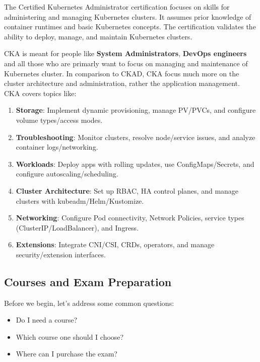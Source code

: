 \begin{definition}[CKA]
	The Certified Kubernetes Administrator certification focuses on skills for administering and managing Kubernetes clusters. It assumes prior knowledge of container runtimes and basic Kubernetes concepts. The certification validates the ability to deploy, manage, and maintain Kubernetes clusters\cite{linuxfoundation-cka}.
\end{definition}

CKA is meant for people like \textbf{System Administrators}, \textbf{DevOps engineers} and all those who are primarly want to focus on managing and maintenance of Kubernetes cluster. In comparison to CKAD, CKA focus much more on the cluster architecture and administration, rather the application management. CKA covers topics like\cite{linuxfoundation-cka}: 

\begin{enumerate}
	\item \textbf{Storage}: Implement dynamic provisioning, manage PV/PVCs, and configure volume types/access modes.  
	\item \textbf{Troubleshooting}: Monitor clusters, resolve node/service issues, and analyze container logs/networking.  
	\item \textbf{Workloads}: Deploy apps with rolling updates, use ConfigMaps/Secrets, and configure autoscaling/scheduling.  
	\item \textbf{Cluster Architecture}: Set up RBAC, HA control planes, and manage clusters with kubeadm/Helm/Kustomize.  
	\item \textbf{Networking}: Configure Pod connectivity, Network Policies, service types (ClusterIP/LoadBalancer), and Ingress.  
	\item \textbf{Extensions}: Integrate CNI/CSI, CRDs, operators, and manage security/extension interfaces.
\end{enumerate}



\subsection{Courses and Exam Preparation}
Before we begin, let's address some common questions:
\begin{itemize}
	\item Do I need a course? 
	\item Which course one should I choose?
	\item Where can I purchase the exam?
\end{itemize} 

